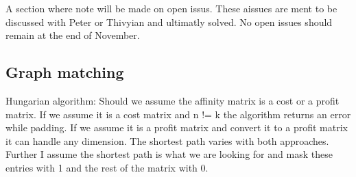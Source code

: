 A section where note will be made on open issus. These aissues are ment to be discussed with Peter or Thivyian and ultimatly solved. No open issues should remain at the end of November.


\subsection{Graph matching}


Hungarian algorithm:
Should we assume the affinity matrix is a cost or a profit matrix. If we assume it is a cost matrix and n != k the algorithm returns an error while padding. If we assume it is a profit matrix and convert it to a profit matrix it can handle any dimension. The shortest path varies with both approaches.
Further I assume the shortest path is what we are looking for and mask these entries with 1 and the rest of the matrix with 0.